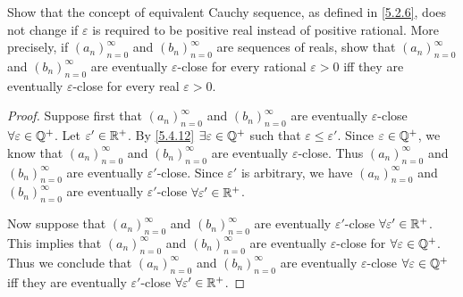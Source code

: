 \begin{ex}\label{ex:6.1.10}
  Show that the concept of equivalent Cauchy sequence, as defined in \cref{5.2.6}, does not change if \(\varepsilon\) is required to be positive real instead of positive rational.
  More precisely, if \((a_n)_{n = 0}^\infty\) and \((b_n)_{n = 0}^\infty\) are sequences of reals, show that \((a_n)_{n = 0}^\infty\) and \((b_n)_{n = 0}^\infty\) are eventually \(\varepsilon\)-close for every rational \(\varepsilon > 0\) iff they are eventually \(\varepsilon\)-close for every real \(\varepsilon > 0\).
\end{ex}

\begin{proof}
  Suppose first that \((a_n)_{n = 0}^\infty\) and \((b_n)_{n = 0}^\infty\) are eventually \(\varepsilon\)-close \(\forall \varepsilon \in \mathbb{Q}^+\).
  Let \(\varepsilon' \in \mathbb{R}^+\).
  By \cref{5.4.12} \(\exists \varepsilon \in \mathbb{Q}^+\) such that \(\varepsilon \leq \varepsilon'\).
  Since \(\varepsilon \in \mathbb{Q}^+\), we know that \((a_n)_{n = 0}^\infty\) and \((b_n)_{n = 0}^\infty\) are eventually \(\varepsilon\)-close.
  Thus \((a_n)_{n = 0}^\infty\) and \((b_n)_{n = 0}^\infty\) are eventually \(\varepsilon'\)-close.
  Since \(\varepsilon'\) is arbitrary, we have \((a_n)_{n = 0}^\infty\) and \((b_n)_{n = 0}^\infty\) are eventually \(\varepsilon'\)-close \(\forall \varepsilon' \in \mathbb{R}^+\).

  Now suppose that \((a_n)_{n = 0}^\infty\) and \((b_n)_{n = 0}^\infty\) are eventually \(\varepsilon'\)-close \(\forall \varepsilon' \in \mathbb{R}^+\).
  This implies that \((a_n)_{n = 0}^\infty\) and \((b_n)_{n = 0}^\infty\) are eventually \(\varepsilon\)-close for \(\forall \varepsilon \in \mathbb{Q}^+\).
  Thus we conclude that \((a_n)_{n = 0}^\infty\) and \((b_n)_{n = 0}^\infty\) are eventually \(\varepsilon\)-close \(\forall \varepsilon \in \mathbb{Q}^+\) iff they are eventually \(\varepsilon'\)-close \(\forall \varepsilon' \in \mathbb{R}^+\).
\end{proof}